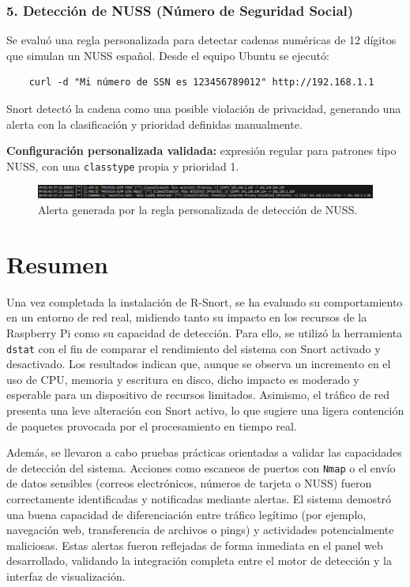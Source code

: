 \documentclass[11pt,a4paper,twoside]{report}
\begin{document}
\vspace{0.5cm}

\subsubsection*{5. Detección de NUSS (Número de Seguridad Social)}

Se evaluó una regla personalizada para detectar cadenas numéricas de 12 dígitos que simulan un NUSS español. Desde el equipo Ubuntu se ejecutó:

\begin{verbatim}
	curl -d "Mi número de SSN es 123456789012" http://192.168.1.1
\end{verbatim}

Snort detectó la cadena como una posible violación de privacidad, generando una alerta con la clasificación y prioridad definidas manualmente.\newline

\textbf{Configuración personalizada validada:} expresión regular para patrones tipo NUSS, con una \texttt{classtype} propia y prioridad 1.

\begin{figure}[H]
	\centering
	\includegraphics[width=\textwidth]{pruebas/6.png}
	\caption{Alerta generada por la regla personalizada de detección de NUSS.}
\end{figure}

\section{Resumen}

Una vez completada la instalación de R-Snort, se ha evaluado su comportamiento en un entorno de red real, midiendo tanto su impacto en los recursos de la Raspberry Pi como su capacidad de detección. Para ello, se utilizó la herramienta \texttt{dstat} con el fin de comparar el rendimiento del sistema con Snort activado y desactivado. Los resultados indican que, aunque se observa un incremento en el uso de CPU, memoria y escritura en disco, dicho impacto es moderado y esperable para un dispositivo de recursos limitados. Asimismo, el tráfico de red presenta una leve alteración con Snort activo, lo que sugiere una ligera contención de paquetes provocada por el procesamiento en tiempo real.\newline

Además, se llevaron a cabo pruebas prácticas orientadas a validar las capacidades de detección del sistema. Acciones como escaneos de puertos con \texttt{Nmap} o el envío de datos sensibles (correos electrónicos, números de tarjeta o NUSS) fueron correctamente identificadas y notificadas mediante alertas. El sistema demostró una buena capacidad de diferenciación entre tráfico legítimo (por ejemplo, navegación web, transferencia de archivos o pings) y actividades potencialmente maliciosas. Estas alertas fueron reflejadas de forma inmediata en el panel web desarrollado, validando la integración completa entre el motor de detección y la interfaz de visualización.\newline
\end{document}

